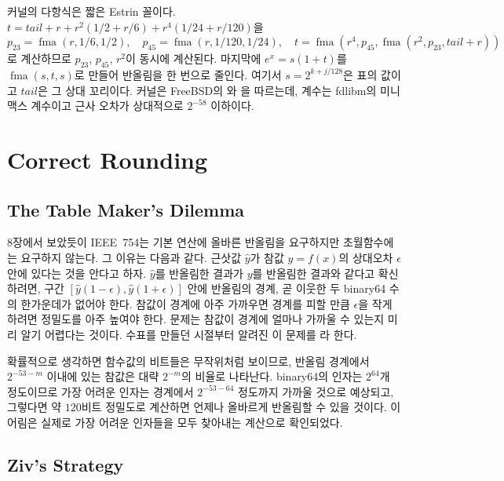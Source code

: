 \begin{instardust}
 커널의 다항식은 짧은 Estrin 꼴이다. $t=\mathit{tail}+r+r^2(1/2+r/6)+r^4(1/24+r/120)$을
\[
p_{23}=\operatorname{fma}(r,1/6,1/2),\quad p_{45}=\operatorname{fma}(r,1/120,1/24),\quad t=\operatorname{fma}(r^4,p_{45},\operatorname{fma}(r^2,p_{23},\mathit{tail}+r))
\]
로 계산하므로 $p_{23}$, $p_{45}$, $r^2$이 동시에 계산된다. 마지막에 $e^x=s(1+t)$를 $\operatorname{fma}(s,t,s)$로 만들어 반올림을 한 번으로 줄인다. 여기서 $s=2^{k+j/128}$은 표의 값이고 $\mathit{tail}$은 그 상대 꼬리이다.  커널은 FreeBSD의 와 을 따르는데, 계수는 fdlibm의 미니맥스 계수이고 근사 오차가 상대적으로 $2^{-58}$ 이하이다.
\end{instardust}

\section{Correct Rounding}
\label{sec:correct-rounding}

\subsection{The Table Maker's Dilemma}

8장에서 보았듯이 IEEE~754는 기본 연산에 올바른 반올림을 요구하지만 초월함수에는 요구하지 않는다. 그 이유는 다음과 같다. 근삿값 $\hat y$가 참값 $y=f(x)$의 상대오차 $\epsilon$ 안에 있다는 것을 안다고 하자. $\hat y$를 반올림한 결과가 $y$를 반올림한 결과와 같다고 확신하려면, 구간 $[\hat y(1-\epsilon),\hat y(1+\epsilon)]$ 안에 반올림의 경계, 곧 이웃한 두 binary64 수의 한가운데가 없어야 한다. 참값이 경계에 아주 가까우면 경계를 피할 만큼 $\epsilon$을 작게 하려면 정밀도를 아주 높여야 한다. 문제는 참값이 경계에 얼마나 가까울 수 있는지 미리 알기 어렵다는 것이다. 수표를 만들던 시절부터 알려진 이 문제를 라 한다.

확률적으로 생각하면 함수값의 비트들은 무작위처럼 보이므로, 반올림 경계에서 $2^{-53-m}$ 이내에 있는 참값은 대략 $2^{-m}$의 비율로 나타난다. binary64의 인자는 $2^{64}$개 정도이므로 가장 어려운 인자는 경계에서 $2^{-53-64}$ 정도까지 가까울 것으로 예상되고, 그렇다면 약 $120$비트 정밀도로 계산하면 언제나 올바르게 반올림할 수 있을 것이다. 이 어림은 실제로 가장 어려운 인자들을 모두 찾아내는 계산으로 확인되었다\cite{lefevre1998}.

\subsection{Ziv's Strategy}

